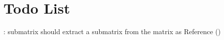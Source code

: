 \chapter{Todo List}
\hypertarget{todo}{}\label{todo}

\begin{DoxyRefList}
\item[Member \doxylink{classq_1_1_matrix_a07c0774f01bfbaa556f923e9523f71b8}{q\+::Matrix\+::sub\+Matrix} (size\+\_\+t start\+Row, size\+\_\+t end\+Row, size\+\_\+t start\+Col, size\+\_\+t end\+Col) const]\label{todo__todo000001}%
%
\+: submatrix should extract a submatrix from the matrix as Reference () 
\end{DoxyRefList}